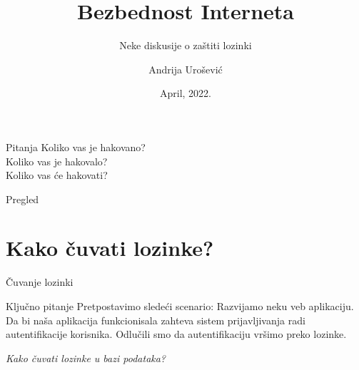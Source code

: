 \documentclass[aspectratio=169,xcolor=dvipsnames]{beamer}
\title[short title]{Bezbednost Interneta}
\subtitle{Neke diskusije o zaštiti lozinki}
\author[Andrija] {Andrija Urošević}
\institute[MATF] {
Univerzitet u Beogradu\\
Matematički fakultet
}
\date{April, 2022.}
\begin{document}

\begin{frame}
    \titlepage
\end{frame}


\begin{frame}{Pitanja}
    \centering
    Koliko vas je hakovano?\\ \vspace{1em}
    Koliko vas je hakovalo?\\ \vspace{1em}
    Koliko vas će hakovati?
\end{frame}


\begin{frame}{Pregled}
    \tableofcontents
\end{frame}

\section{Kako čuvati lozinke?}

\begin{frame}{Čuvanje lozinki}

    \begin{alertblock}{Ključno pitanje}
        Pretpostavimo sledeći scenario: Razvijamo neku veb aplikaciju. Da bi
        naša aplikacija funkcionisala zahteva sistem prijavljivanja radi
        autentifikacije korisnika. Odlučili smo da autentifikaciju vršimo
        preko lozinke.

        \vspace{1em}

        \textit{Kako čuvati lozinke u bazi podataka?}
    \end{alertblock}

\end{frame}

\end{document}
